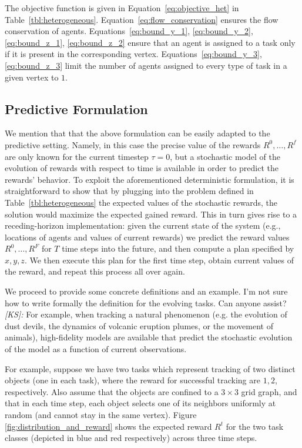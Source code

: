 \documentclass[conference]{IEEEtran}
\newcommand{\frmargin}[2]{{\color{brown}#1}\marginpar{\color{brown}\raggedright\footnotesize [FR]:#2}}
\newcommand{\ksline}[2]{{\color{blue}#1}{\em \color{blue}[KS]: #2}}
\newcommand{\todo}[1]{{\color{red}{\bf TODO:} #1}}
\newcommand{\frmargin}[2]{#1}
\newcommand{\ksline}[2]{#1}
\newcommand{\todo}[1]{}
\begin{document}
The objective function is given in Equation~\eqref{eq:objective_het} in Table~\ref{tbl:heterogeneous}. Equation~\eqref{eq:flow_conservation} ensures the flow conservation of agents. 
Equations~\eqref{eq:bound_y_1}, \eqref{eq:bound_y_2}, \eqref{eq:bound_z_1}, \eqref{eq:bound_z_2} ensure that an agent is assigned to a task only if it is present in the corresponding vertex.    Equations~\eqref{eq:bound_y_3}, \eqref{eq:bound_z_3} limit the number of agents assigned to every type of task in a given vertex to $1$. 

\subsection{Predictive Formulation}\label{sec:predictive}
We mention that that the above formulation can be easily adapted to the predictive setting. Namely, in this case the precise value of the rewards $R^0,\ldots,R^f$ are only known for the current timestep $\tau=0$, but a stochastic model of the evolution of rewards with respect to time is available in order to predict the rewards' behavior. To exploit the aforementioned deterministic formulation, it is straightforward to show that by plugging into the problem defined in Table~\ref{tbl:heterogeneous} the expected values of the stochastic rewards, the solution would maximize the expected gained reward. This in turn gives rise to a receding-horizon implementation: given the current state of the system (e.g., locations of agents and values of current rewards) we predict the reward values $R^0,\ldots,R^F$ for $T$ time steps into the future, and then compute a plan specified by $x,y,z$. We then execute this plan for the first time step, obtain current values of the reward, and repeat this process all over again. 

We proceed to provide some concrete definitions and an example.
\ksline{I'm not sure how to write formally the definition for the evolving tasks. Can anyone assist?}{}
\frmargin{
For example, when tracking a natural phenomenon (e.g. the evolution of dust devils, the dynamics of volcanic eruption plumes, or the movement of animals), high-fidelity models are available that predict the stochastic evolution of the model as a function of current observations.}{Added}


For example, suppose we have two tasks which represent tracking of two distinct objects (one in each task), where the reward for successful tracking are $1, 2$, respectively. Also assume that the objects are confined to a $3\times 3$ grid graph, and that in each time step, each object selects one of its neighbors uniformly at random (and cannot stay in the same vertex). Figure \ref{fig:distribution_and_reward} shows the expected reward $R^t$ for the two task classes (depicted in blue and red respectively) across three time steps.
\end{document}
